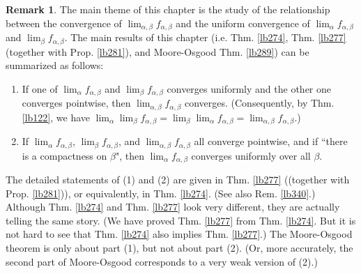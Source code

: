\documentclass[12pt,b5paper,notitlepage]{article}
\theoremstyle{definition}
\newtheorem{rem}[df]{Remark}
\theoremstyle{plain}
\numberwithin{equation}{section}
\begin{document}
\begin{rem}
The main theme of this chapter is the study of the relationship between the convergence of $\lim_{\alpha,\beta}f_{\alpha,\beta}$ and the uniform convergence of $\lim_\alpha f_{\alpha,\beta}$ and $\lim_\beta f_{\alpha,\beta}$. The main results of this chapter (i.e. Thm. \ref{lb274}, Thm. \ref{lb277} (together with Prop. \ref{lb281}), and Moore-Osgood Thm. \ref{lb289}) can be summarized as follows:
\begin{enumerate}
\item[(1)] If one of $\lim_\alpha f_{\alpha,\beta}$ and $\lim_\beta f_{\alpha,\beta}$ converges uniformly and the other one converges pointwise, then $\lim_{\alpha,\beta}f_{\alpha,\beta}$ converges. (Consequently, by Thm. \ref{lb122}, we have $\lim_\alpha\lim_\beta f_{\alpha,\beta}=\lim_\beta\lim_\alpha f_{\alpha,\beta}=\lim_{\alpha,\beta}f_{\alpha,\beta}$.)
\item[(2)] If $\lim_\alpha f_{\alpha,\beta}$, $\lim_\beta f_{\alpha,\beta}$, and $\lim_{\alpha,\beta}f_{\alpha,\beta}$ all converge pointwise, and if ``there is a compactness on $\beta$", then $\lim_\alpha f_{\alpha,\beta}$ converges uniformly over all $\beta$.
\end{enumerate}
The detailed statements of (1) and (2) are given in Thm. \ref{lb277} ((together with Prop. \ref{lb281})), or equivalently, in Thm. \ref{lb274}. (See also Rem. \ref{lb340}.) Although Thm. \ref{lb274} and Thm. \ref{lb277} look very different, they are actually telling the same story. (We have proved Thm. \ref{lb277} from Thm. \ref{lb274}. But it is not hard to see that Thm. \ref{lb274} also implies Thm. \ref{lb277}.) The Moore-Osgood theorem is only about part (1), but not about part (2). (Or, more accurately, the second part of Moore-Osgood corresponds to a very weak version of (2).)
\end{rem}











\end{document}
